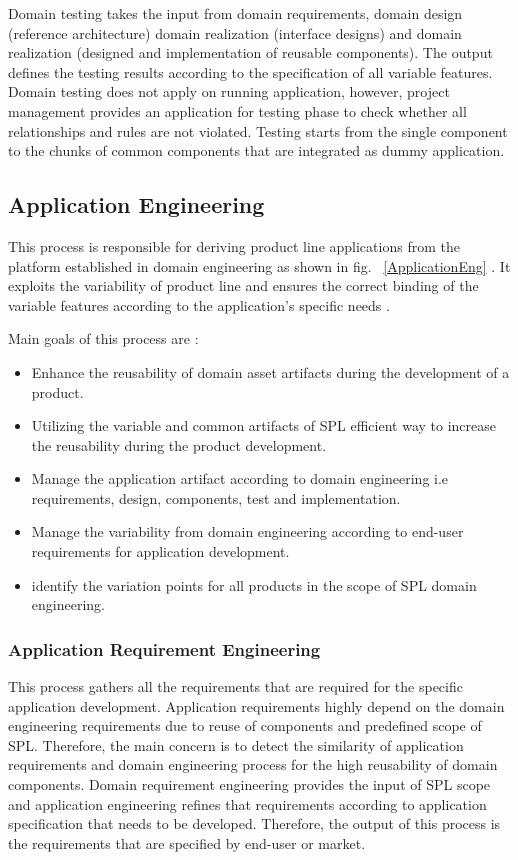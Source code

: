 Domain testing takes the input from domain requirements, domain design (reference architecture) domain realization (interface designs) and domain realization (designed and implementation of reusable components). The output defines the testing results according to the specification of all variable features. Domain testing does not apply on running application, however, project management provides an application for testing phase to check whether all relationships and rules are not violated. Testing starts from the single component to the chunks of common components that are integrated as dummy application.


\subsection{Application Engineering}

This process is responsible for deriving product line applications from the platform established in domain engineering \cite{t62, t63} as shown in fig. ~\ref{ApplicationEng} \cite{tt59}. It exploits the variability of product line and ensures the correct binding of the variable features according to the application's specific needs \cite{t64}.



Main goals of this process are \cite{t65, t66}:
\begin{itemize}
	\item Enhance the reusability of domain asset artifacts during the development of a product.
	\item Utilizing the variable and common artifacts of SPL  efficient way to increase the reusability during the product development.
	\item Manage the application artifact according to domain engineering i.e requirements, design, components, test and implementation.
	\item Manage the variability from domain engineering according to end-user requirements for application development.
	\item identify the variation points for all products in the scope of SPL domain engineering.
\end{itemize}

\subsubsection{Application Requirement Engineering}

This process gathers all the requirements that are required for the specific application development. Application requirements highly depend on the domain engineering requirements due to reuse of components and predefined scope of SPL. Therefore, the main concern is to detect the similarity of application requirements and domain engineering process for the high reusability of domain components. Domain requirement engineering provides the input of SPL scope and application engineering refines that requirements according to application specification that needs to be developed. Therefore, the output of this process is the requirements that are specified by end-user or market.

